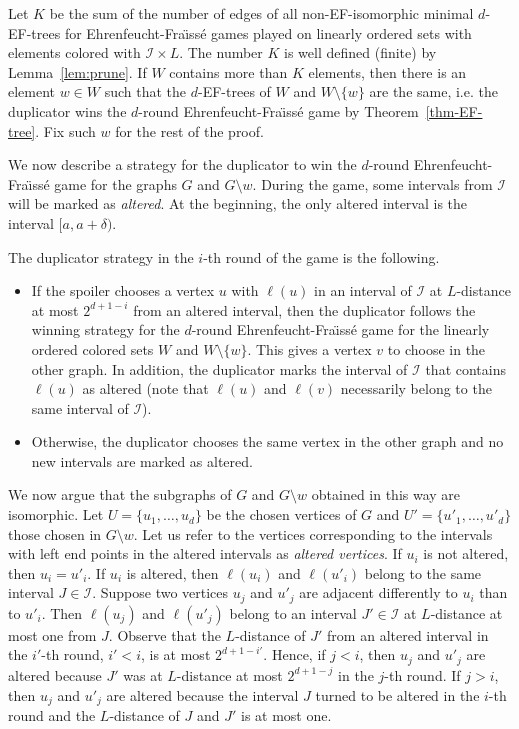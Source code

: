 \documentclass{CSML}
\newcommand{\II}{\mathcal{I}}
\theoremstyle{plain}\newtheorem{claim}[thm]{Claim}
\begin{document}
Let $K$ be the sum of the number of edges of all non-EF-isomorphic minimal $d$-EF-trees for Ehrenfeucht-Fra{\"\i}ss\'e games
played on linearly ordered sets with elements colored with $\II\times L$.
The number $K$ is well defined (finite) by Lemma~\ref{lem:prune}.
If $W$ contains more than $K$ elements, then there is an element $w\in W$ such that
the $d$-EF-trees of $W$ and $W\setminus\{w\}$ are the same, i.e. 
the duplicator wins the $d$-round Ehrenfeucht-Fra{\"\i}ss\'e game by Theorem~\ref{thm-EF-tree}.
Fix such $w$ for the rest of the proof.

We now describe a strategy for the duplicator to win the $d$-round Ehrenfeucht-Fra{\"\i}ss\'e game
for the graphs $G$ and $G\setminus w$.
During the game, some intervals from $\II$ will be marked as {\em altered}.
At the beginning, the only altered interval is the interval $[a,a+\delta)$.

The duplicator strategy in the $i$-th round of the game is the following.
\begin{itemize}
\item If the spoiler chooses a vertex $u$ with $\ell(u)$ in an interval of $\II$ at $L$-distance
      at most $2^{d+1-i}$ from an altered interval, then the duplicator follows the winning strategy
      for the $d$-round Ehrenfeucht-Fra{\"\i}ss\'e game for the linearly ordered colored sets $W$ and $W\setminus\{w\}$.
      This gives a vertex $v$ to choose in the other graph.
      In addition, the duplicator marks the interval of $\II$ that contains $\ell(u)$ as altered (note that
      $\ell(u)$ and $\ell(v)$ necessarily belong to the same interval of $\II$).
\item Otherwise, the duplicator chooses the same vertex in the other graph and no new intervals are marked as altered.
\end{itemize}

\noindent We now argue that the subgraphs of $G$ and $G\setminus w$ obtained in this way are isomorphic.
Let $U=\{u_1,\ldots,u_d\}$ be the chosen vertices of $G$ and $U'=\{u'_1,\ldots,u'_d\}$ those chosen in $G\setminus w$.
Let us refer to the vertices corresponding to the intervals with left end points in the altered intervals as
{\em altered vertices}.
If $u_i$ is not altered, then $u_i=u'_i$.
If $u_i$ is altered, then $\ell(u_i)$ and $\ell(u'_i)$ belong to the same interval $J\in\II$.
Suppose two vertices $u_j$ and $u'_j$ are adjacent differently to $u_i$ than to $u'_i$.
Then $\ell(u_j)$ and $\ell(u'_j)$ belong to an interval $J'\in\II$ at $L$-distance at most one from $J$.
Observe that the $L$-distance of $J'$ from an altered interval in the $i'$-th round, $i'<i$, is at most $2^{d+1-i'}$.
Hence, if $j<i$, then $u_j$ and $u'_j$ are altered because $J'$ was at $L$-distance at most $2^{d+1-j}$ in the $j$-th round.
If $j>i$, then $u_j$ and $u'_j$ are altered
because the interval $J$ turned to be altered in the $i$-th round and the $L$-distance of $J$ and $J'$ is at most one.
\end{document}
